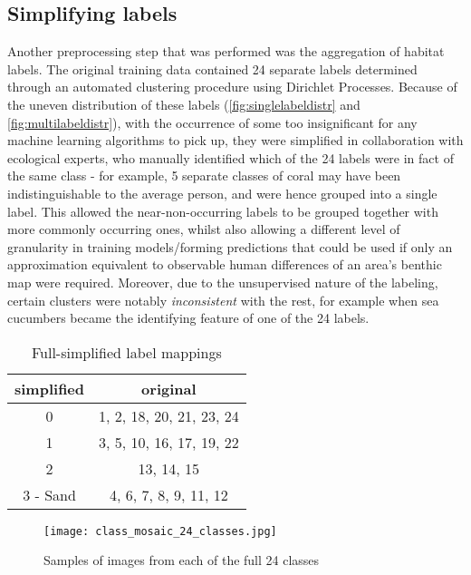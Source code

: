 \subsection{Simplifying labels}
Another preprocessing step that was performed was the aggregation of habitat labels. The original training data contained 24 separate labels determined through an automated clustering procedure using Dirichlet Processes. Because of the uneven distribution of these labels (\autoref{fig:singlelabeldistr} and \autoref{fig:multilabeldistr}), with the occurrence of some too insignificant for any machine learning algorithms to pick up, they were simplified in collaboration with ecological experts, who manually identified which of the 24 labels were in fact of the same class - for example, 5 separate classes of coral may have been indistinguishable to the average person, and were hence grouped into a single label. This allowed the near-non-occurring labels to be grouped together with more commonly occurring ones, whilst also allowing a different level of granularity in training models/forming predictions that could be used if only an approximation equivalent to observable human differences of an area's benthic map were required. Moreover, due to the unsupervised nature of the labeling, certain clusters were notably \textit{inconsistent} with the rest, for example when sea cucumbers became the identifying feature of one of the 24 labels.

\begin{table}[H]
    \centering
    \begin{tabular}{|c| c|}
        \hline
        simplified & original \\\hline
        0 & 1, 2, 18, 20, 21, 23, 24 \\
        1 & 3, 5, 10, 16, 17, 19, 22\\
        2 & 13, 14, 15 \\
        3 - Sand & 4, 6, 7, 8, 9, 11, 12 \\
        \hline
    \end{tabular}
    \caption{Full-simplified label mappings \tiny{}}
    \label{table:labelmappings}
\end{table}

\begin{figure}
    \texttt{[image: class\_mosaic\_24\_classes.jpg]}
    \caption{Samples of images from each of the full 24 classes}
    \label{fig:24classes}
\end{figure}

